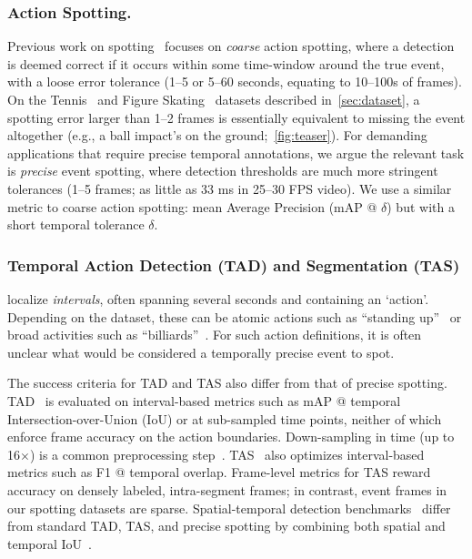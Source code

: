 \documentclass[runningheads]{llncs}
\newcommand{\notation}[1]{\ensuremath{#1}\xspace}
\newcommand{\Tolerance}{\notation{\delta}}
\begin{document}
\subsubsection*{Action Spotting.}
Previous work on spotting~\cite{soccernetv2} focuses
on \emph{coarse} action spotting, where a detection is deemed correct if it
occurs within some time-window around the true event, with a loose error
tolerance (1--5 or 5--60 seconds, equating to 10--100s of frames).
On the Tennis~\cite{vid2player} and Figure Skating~\cite{vpd} datasets described in~\autoref{sec:dataset}, a spotting
error larger than 1--2 frames is essentially equivalent to missing the event
altogether (e.g., a ball impact's on the ground;~\autoref{fig:teaser}).
For demanding applications that require precise temporal annotations,
we argue the relevant task is \emph{precise} event spotting, where
detection thresholds are much more stringent tolerances (1--5 frames; as little as 33 ms in 25--30 FPS video).
We use a similar metric to coarse action spotting: mean Average Precision (mAP @ $\Tolerance$) but with a short temporal tolerance \Tolerance.

\subsubsection*{Temporal Action Detection (TAD) and Segmentation (TAS)} localize \emph{intervals}, often spanning several seconds and containing an `action'. Depending on the dataset, these can be atomic actions such as ``standing up''~\cite{charades} or broad activities such as ``billiards''~\cite{thumos14}.
For such action definitions, it is often unclear what would be considered a temporally precise event to spot.

The success criteria for TAD and TAS also differ from that of precise spotting.
TAD~\cite{activitynet,toyotasmarthome,thumos14,charades,multithumos} is evaluated on interval-based metrics such as mAP @ temporal Intersection-over-Union (IoU) or at sub-sampled time points, neither of which enforce frame accuracy on the action boundaries.
Down-sampling in time (up to 16$\times$) is a common preprocessing step~\cite{sstad,bmn,bsn,charadeschallenge,gtad,actionformer}.
TAS~\cite{gtea,breakfast,50salads} also optimizes interval-based metrics such as F1 @ temporal overlap.
Frame-level metrics for TAS reward accuracy on densely labeled, intra-segment frames; in contrast, event frames in our spotting datasets are sparse.
Spatial-temporal detection benchmarks~\cite{avakinetics,multisports} differ from standard TAD, TAS, and precise spotting by combining both spatial and temporal IoU~\cite{multisports}.
\end{document}
